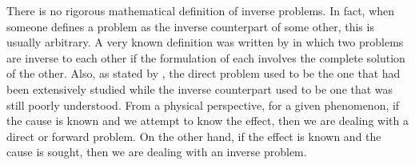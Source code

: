 		There is no rigorous mathematical definition of inverse problems. In fact, when someone defines a problem as the inverse counterpart of some other, this is usually arbitrary. A very known definition was written by \cite{keller1976inverse} in which two problems are inverse to each other if the formulation of each involves the complete solution of the other. Also, as stated by \cite{bertero2020introduction}, the direct problem used to be the one that had been extensively studied while the inverse counterpart used to be one that was still poorly understood. From a physical perspective, for a given phenomenon, if the cause is known and we attempt to know the effect, then we are dealing with a direct or forward problem. On the other hand, if the effect is known and the cause is sought, then we are dealing with an inverse problem.
	

